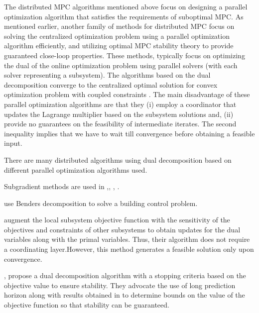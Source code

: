 \documentclass[10pt]{article}
\theoremstyle{definition}
\begin{document}
The distributed MPC algorithms mentioned above focus on designing a parallel optimization algorithm that satisfies the requirements of suboptimal MPC. As mentioned earlier, another family of methods for distributed MPC focus on solving the centralized optimization problem using a parallel optimization algorithm efficiently, and utilizing optimal MPC stability theory to provide guaranteed close-loop properties. These methods, typically focus on optimizing the dual of the online optimization problem using parallel solvers (with each solver representing a subsystem). The algorithms based on the dual decomposition converge to the centralized optimal solution for convex optimization problem with coupled constraints . The main disadvantage of these parallel optimization algorithms are that they (i) employ a coordinator that updates the Lagrange multiplier based on the subsystem solutions and, (ii) provide no guarantees on the feasibility of intermediate iterates. The second inequality implies that we have to wait till convergence before obtaining a feasible input.

There are many distributed algorithms using dual decomposition based on different parallel optimization algorithms used.

Subgradient methods are  used in \citet{cheng:forbes:yip:2007},\citet{ma:anderson:borrelli:2011},
\citet{wakasa:arakawa:tanka:akashi:2008},
\citet{marcos:forbes:guay:2009}. 

\citet{morocan:bourdais:dumur:buisson:2011} use Benders decomposition to solve a building control problem.

\citet{scheu:marquardt:2011}  augment the
local subsystem objective function with the sensitivity of the
objectives and constraints of other subsystems to obtain updates for
the dual variables along with the primal variables. Thus, their algorithm does not require a coordinating layer.However, this
method generates a feasible solution only upon
convergence.

 \citet{giselsson:doan:keviczky:schutter:rantzer:2012}, \citet{giselsson:rantzer:2010}
propose a dual decomposition algorithm with a stopping criteria based
on the objective value to ensure stability. They advocate the use of
long prediction horizon along with results obtained in
\citet{grune:2009} to determine bounds on the value of the objective
function so that stability can be guaranteed.
\end{document}
